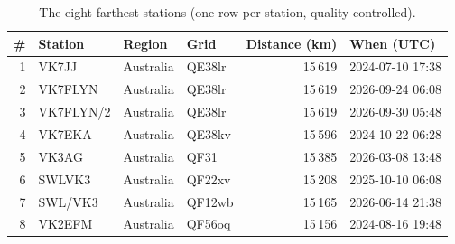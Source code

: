 \begin{table}[htbp]\centering\small
\caption{The eight farthest stations (one row per station, quality-controlled).}\label{tab:records}
\begin{tabular}{rlllrl}
\toprule
\# & Station & Region & Grid & Distance (km) & When (UTC) \\
\midrule
1 & VK7JJ & Australia & QE38lr & 15\,619 & 2024-07-10 17:38 \\
2 & VK7FLYN & Australia & QE38lr & 15\,619 & 2026-09-24 06:08 \\
3 & VK7FLYN\slash 2 & Australia & QE38lr & 15\,619 & 2026-09-30 05:48 \\
4 & VK7EKA & Australia & QE38kv & 15\,596 & 2024-10-22 06:28 \\
5 & VK3AG & Australia & QF31 & 15\,385 & 2026-03-08 13:48 \\
6 & SWLVK3 & Australia & QF22xv & 15\,208 & 2025-10-10 06:08 \\
7 & SWL\slash VK3 & Australia & QF12wb & 15\,165 & 2026-06-14 21:38 \\
8 & VK2EFM & Australia & QF56oq & 15\,156 & 2024-08-16 19:48 \\
\bottomrule
\end{tabular}
\end{table}
